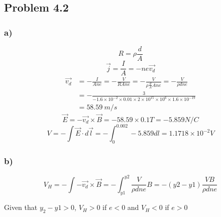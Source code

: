 \documentclass[../homework.tex]{subfiles}
\begin{document}
\subsection{Problem 4.2}
\subsubsection*{a)}
\begin{equation*}
    R = \rho \frac{d}{A}
\end{equation*}
\begin{equation*}
    \vec{j} = \frac{I}{A} = -ne \vec{v_d}
\end{equation*}
\begin{align*}
    \vec{v_d} &= -\frac{I}{Ane} = -\frac{V}{RAne} = -\frac{V}{\rho \frac{d}{A} A n e} = -\frac{V}{\rho d n e} \\
    &= -\frac{3}{-1.6 \times 10^{-2} \times 0.01 \times 2 \times 10^{15} \times 10^6 \times 1.6 \times 10^{-19}} \\
    &= 58.59\ m / s
\end{align*}
\begin{equation*}
    \vec{E} = -\vec{v_d} \times \vec{B} = -58.59 \times 0.1 T = -5.859 N / C
\end{equation*}
\begin{equation*}
    V = - \int \vec{E} \cdot d \vec{l} = - \int_{0}^{0.002} -5.859 dl = 1.1718 \times 10^{-2}V
\end{equation*}

\subsubsection*{b)}
\begin{equation*}
    V_H = -\int -\vec{v_d} \times \vec{B} = -\int_{y1}^{y2} \frac{V}{\rho d n e} B = -(y2 - y1) \frac{VB}{\rho d n e}
\end{equation*}

Given that $y_2 - y1 > 0$, $V_H > 0$ if $e < 0$ and $V_H < 0$ if $e > 0$
\end{document}
